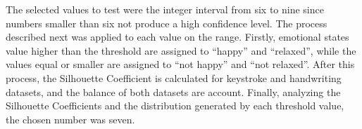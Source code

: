 \documentclass[conference]{IEEEtran}
\begin{document}
The selected values to test were the integer interval from six to nine since numbers smaller than six not produce a high confidence level. The process described next was applied to each value on the range. Firstly, emotional states value higher than the threshold are assigned to ``happy'' and ``relaxed'',  while the values equal or smaller are assigned to ``not happy'' and ``not relaxed''. After this process, the Silhouette Coefficient is calculated for keystroke and handwriting datasets, and the balance of both datasets are account. Finally, analyzing the Silhouette Coefficients and the distribution generated by each threshold value, the chosen number was seven.



\end{document}
